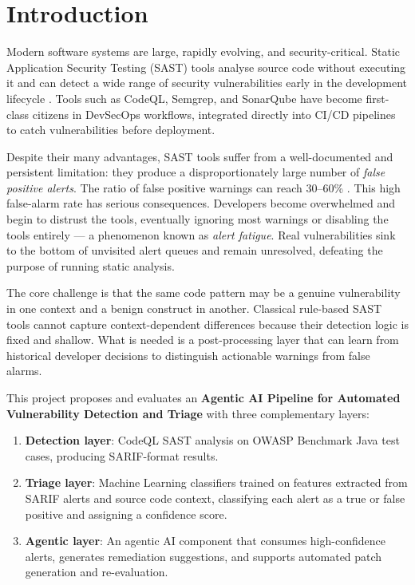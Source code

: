 \chapter{Introduction}
\label{ch:introduction}

Modern software systems are large, rapidly evolving, and security-critical.
Static Application Security Testing (SAST) tools analyse source code without
executing it and can detect a wide range of security vulnerabilities early in
the development lifecycle \cite{hegedus2022sca}. Tools such as CodeQL, Semgrep,
and SonarQube have become first-class citizens in DevSecOps workflows, integrated
directly into CI/CD pipelines to catch vulnerabilities before deployment.

Despite their many advantages, SAST tools suffer from a well-documented and
persistent limitation: they produce a disproportionately large number of
\emph{false positive alerts}. The ratio of false positive warnings can reach
30--60\% \cite{hegedus2022sca}. This high false-alarm rate has serious
consequences. Developers become overwhelmed and begin to distrust the tools,
eventually ignoring most warnings or disabling the tools entirely --- a
phenomenon known as \emph{alert fatigue}. Real vulnerabilities sink to the
bottom of unvisited alert queues and remain unresolved, defeating the purpose
of running static analysis.

The core challenge is that the same code pattern may be a genuine vulnerability
in one context and a benign construct in another. Classical rule-based SAST tools
cannot capture context-dependent differences because their detection logic is
fixed and shallow. What is needed is a post-processing layer that can learn from
historical developer decisions to distinguish actionable warnings from false alarms.

This project proposes and evaluates an \textbf{Agentic AI Pipeline for Automated
Vulnerability Detection and Triage} with three complementary layers:

\begin{enumerate}
  \item \textbf{Detection layer}: CodeQL SAST analysis on OWASP Benchmark Java
        test cases, producing SARIF-format results.
  \item \textbf{Triage layer}: Machine Learning classifiers trained on features
        extracted from SARIF alerts and source code context, classifying each
        alert as a true or false positive and assigning a confidence score.
  \item \textbf{Agentic layer}: An agentic AI component that consumes
        high-confidence alerts, generates remediation suggestions, and supports
        automated patch generation and re-evaluation.
\end{enumerate}

